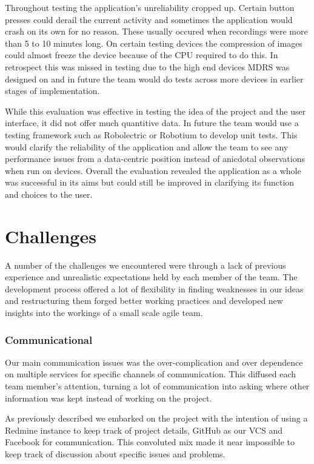 \documentclass{l3proj}
\begin{document}
Throughout testing the application's unreliability cropped up. Certain button presses could derail the current activity and sometimes the application would crash on its own for no reason. These usually occured when recordings were more than 5 to 10 minutes long. On certain testing devices the compression of images could almost freeze the device because of the CPU required to do this. In retrospect this was missed in testing due to the high end devices MDRS was designed on and in future the team would do tests across more devices in earlier stages of implementation.

While this evaluation was effective in testing the idea of the project and the user interface, it did not offer much quantitive data. In future the team would use a testing framework such as Robolectric or Robotium to develop unit tests. This would clarify the reliability of the application and allow the team to see any performance issues from a data-centric position instead of anicdotal observations when run on devices. Overall the evaluation revealed the application as a whole was successful in its aims but could still be improved in clarifying its function and choices to the user.


\chapter{Challenges}
\label{Challenges}

A number of the challenges we encountered were through a lack of previous experience and unrealistic expectations held by each member of the team. The development process offered a lot of flexibility in finding weaknesses in our ideas and restructuring them forged better working practices and developed new insights into the workings of a small scale agile team.

\subsection{Communicational}
Our main communication issues was the over-complication and over dependence on multiple services for specific channels of communication. This diffused each team member's attention, turning a lot of communication into asking where other information was kept instead of working on the project.

As previously described we embarked on the project with the intention of using a Redmine instance to keep track of project details, GitHub as our VCS and Facebook for communication. This convoluted mix made it near impossible to keep track of discussion about specific issues and problems.
\end{document}
